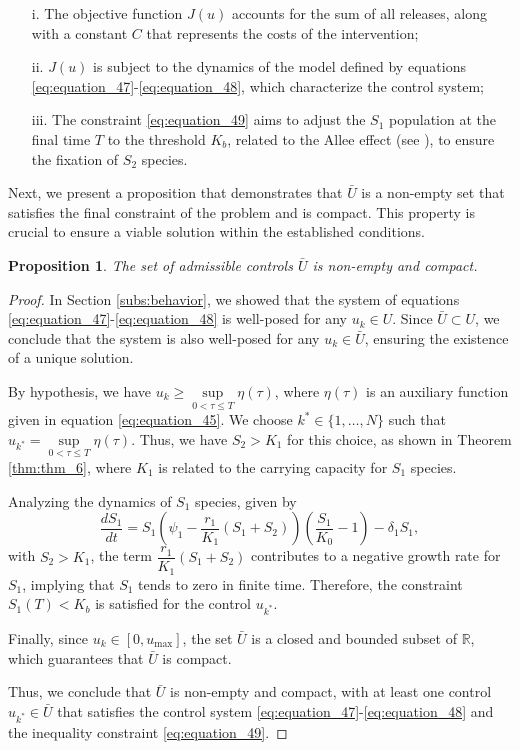\documentclass[10pt,letterpaper]{article}
\newtheorem{proposition}{Proposition}
\begin{document}
\begin{itemize}
    \item[i.] The objective function \( J(u) \) accounts for the sum of all releases, along with a constant \( C \) that represents the costs of the intervention;
    \item[ii.] \( J(u) \) is subject to the dynamics of the model defined by equations \eqref{eq:equation_47}-\eqref{eq:equation_48}, which characterize the control system;
    \item[iii.] The constraint \eqref{eq:equation_49} aims to adjust the $S_1$ population at the final time \( T \) to the threshold \( K_b \), related to the Allee effect (see \cite{Campo2017,barton2011spatialA1}), to ensure the fixation of $S_2$ species.
\end{itemize}
Next, we present a proposition that demonstrates that \( \bar{U} \) is a non-empty set that satisfies the final constraint of the problem and is compact. This property is crucial to ensure a viable solution within the established conditions.
\begin{proposition}\label{prop:prop_5}
    The set of admissible controls $ \bar{U} $ is non-empty and compact.
\end{proposition}
\begin{proof}
    In Section \eqref{subs:behavior}, we showed that the system of equations \eqref{eq:equation_47}-\eqref{eq:equation_48} is well-posed for any $ u_k \in U $. Since $ \bar{U} \subset U $, we conclude that the system is also well-posed for any $ u_k \in \bar{U} $, ensuring the existence of a unique solution.

    By hypothesis, we have $ u_k \geq \sup\limits_{0 < \tau \leq T} \eta(\tau) $, where $ \eta(\tau) $ is an auxiliary function given in equation \eqref{eq:equation_45}. We choose $ k^* \in \{1, \dots, N\} $ such that $ u_{k^*} = \sup\limits_{0 < \tau \leq T} \eta(\tau) $. Thus, we have $ S_2 > K_1 $ for this choice, as shown in Theorem \eqref{thm:thm_6}, where $ K_1 $ is related to the carrying capacity for $S_1$ species. 

    Analyzing the dynamics of $S_1$ species, given by
    \begin{equation}\label{eq:equation_51}
      \dfrac{dS_1}{dt} = S_1\left(\psi_1 - \dfrac{r_1}{K_1}(S_1 + S_2)\right)\left(\dfrac{S_1}{K_0} - 1 \right) - \delta_1 S_1,  
    \end{equation}
    with $ S_2 > K_1 $, the term $ \dfrac{r_1}{K_1}(S_1 + S_2) $ contributes to a negative growth rate for $ S_1 $, implying that $ S_1 $ tends to zero in finite time. Therefore, the constraint $ S_1(T) < K_b $ is satisfied for the control $ u_{k^*} $.

    Finally, since $ u_k \in [0, u_{\max}] $, the set $ \bar{U} $ is a closed and bounded subset of $ \mathbb{R} $, which guarantees that $ \bar{U} $ is compact. 

    Thus, we conclude that $ \bar{U} $ is non-empty and compact, with at least one control $ u_{k^*} \in \bar{U} $ that satisfies the control system \eqref{eq:equation_47}-\eqref{eq:equation_48} and the inequality constraint \eqref{eq:equation_49}.
\end{proof}
\end{document}
